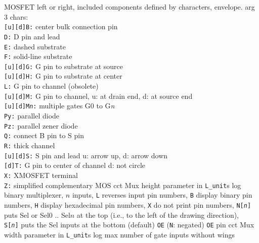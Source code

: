   {MOSFET left or right, included components defined by characters,
  envelope.
   arg 3 chars:\\
   {\tt [u][d]B:} center bulk connection pin\\
   {\tt D:} D pin and lead\\
   {\tt E:} dashed substrate\\
   {\tt F:} solid-line substrate\\
   {\tt [u][d]G:} G pin to substrate at source\\
   {\tt [u][d]H:} G pin to substrate at center\\
   {\tt L:} G pin to channel (obsolete)\\
   {\tt [u][d]M:} G pin to channel, u: at drain end, d: at source end\\
   {\tt [u][d]M{\sl n}:} multiple gates G0 to G{\sl n}\\
   {\tt Py:} parallel diode\\
   {\tt Pz:} parallel zener diode\\
   {\tt Q:} connect B pin to S pin\\
   {\tt R:} thick channel\\
   {\tt [u][d]S:} S pin and lead u: arrow up, d: arrow down\\
   {\tt [d]T:} G pin to center of channel d: not circle\\
   {\tt X:} XMOSFET terminal\\
   {\tt Z:} simplified complementary MOS
   }%
%
  {cct}%
  {Mux height parameter in {\tt L\_unit}s}%
%
  {log}%
  {binary multiplexer, $n$ inputs,
    {\tt L} reverses input pin numbers, {\tt B} display binary pin
    numbers, {\tt H} display hexadecimal pin numbers, {\tt X} do not
    print pin numbers, {\tt N[{\sl n}]} puts Sel or Sel$0$ .. Sel$n$
    at the top (i.e., to the left of the drawing direction), {\tt
    S[{\sl n}]} puts the Sel inputs at the bottom (default) {\tt OE}
    ({\tt N}: negated) {\tt OE} pin }%
%
  {cct}%
  {Mux width parameter in {\tt L\_unit}s}%
%
  {log}%
  {max number of gate inputs without wings}%

%

